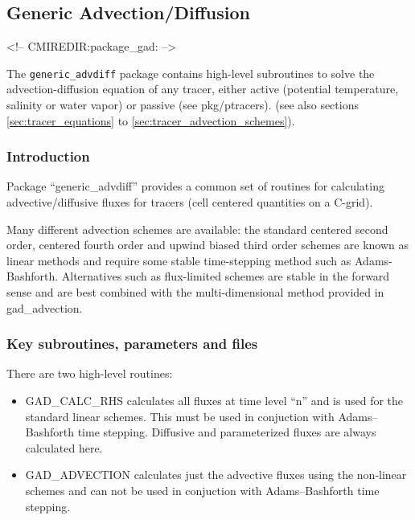 

\subsection{Generic Advection/Diffusion}
\label{sec:pkg:gad}
\begin{rawhtml}
<!-- CMIREDIR:package_gad: -->
\end{rawhtml}

The {\tt generic\_advdiff} package contains high-level
subroutines to solve the advection-diffusion equation
of any tracer, either active (potential temperature,
salinity or water vapor) or passive (see pkg/ptracers).
(see also sections \ref{sec:tracer_equations} to
\ref{sec:tracer_advection_schemes}).


\subsubsection{Introduction}
Package ``generic\_advdiff'' provides a common set of routines for
calculating advective/diffusive fluxes for tracers (cell centered
quantities on a C-grid).

Many different advection schemes are available: the standard centered
second order, centered fourth order and upwind biased third order
schemes are known as linear methods and require some stable
time-stepping method such as Adams-Bashforth. Alternatives such as
flux-limited schemes are stable in the forward sense and are best
combined with the multi-dimensional method provided in gad\_advection.

\subsubsection{Key subroutines, parameters and files}
\label{sec:pkg:gad:implementation_synopsis}
There are two high-level routines:
\begin{itemize}
\item{GAD\_CALC\_RHS} calculates all fluxes at time level ``n'' and is
  used for the standard linear schemes. This must be used in
  conjuction with Adams--Bashforth time stepping. Diffusive and
  parameterized fluxes are always calculated here.

\item{GAD\_ADVECTION} calculates just the advective fluxes using the
  non-linear schemes and can not be used in conjuction with
  Adams--Bashforth time stepping.
\end{itemize}

